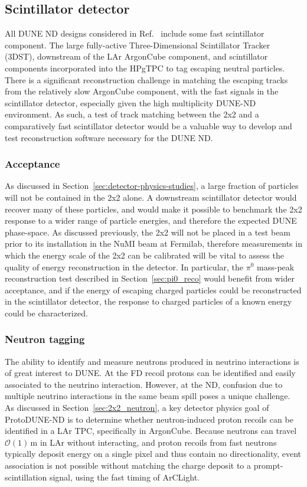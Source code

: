 \subsection{Scintillator detector}
\label{sec:minerva}
All DUNE ND designs considered in Ref.~\cite{dune_ndcsg} include some fast scintillator component. The large fully-active Three-Dimensional Scintillator Tracker (3DST), downstream of the LAr ArgonCube component, and scintillator components incorporated into the HPgTPC to tag escaping neutral particles. 
There is a significant reconstruction challenge in matching the escaping tracks from the relatively slow ArgonCube component, with the fast signals in the scintillator detector, especially given the high multiplicity DUNE-ND environment. 
As such, a test of track matching between the 2x2 and a comparatively fast scintillator detector would be a valuable way to develop and test reconstruction software necessary for the DUNE ND.


\subsubsection{Acceptance}
As discussed in Section~\ref{sec:detector-physics-studies}, a large fraction of particles will not be contained in the 2x2 alone. A downstream scintillator detector would recover many of these particles, and would make it possible to benchmark the 2x2 response to a wider range of particle energies, and therefore the expected DUNE phase-space. As discussed previously, the 2x2 will not be placed in a test beam prior to its installation in the NuMI beam at Fermilab, therefore measurements in which the energy scale of the 2x2 can be calibrated will be vital to assess the quality of energy reconstruction in the detector. In particular, the $\pi^{0}$ mass-peak reconstruction test described in Section~\ref{sec:pi0_reco} would benefit from wider acceptance, and if the energy of escaping charged particles could be reconstructed in the scintillator detector, the response to charged particles of a known energy could be characterized.

\subsubsection{Neutron tagging}
The ability to identify and measure neutrons produced in neutrino interactions is of great interest to DUNE.  At the FD recoil protons can be identified and easily associated to the neutrino interaction.  However, at the ND, confusion due to multiple neutrino interactions in the same beam spill poses a unique challenge.  As discussed in Section~\ref{sec:2x2_neutron}, a key detector physics goal of ProtoDUNE-ND is to determine whether neutron-induced proton recoils can be identified in a LAr TPC, specifically in ArgonCube. Because neutrons can travel $\mathcal{O}\left(1\right)\,\mathrm{m}$ in LAr without interacting, and proton recoils from fast neutrons typically deposit energy on a single pixel and thus contain no directionality, event association is not possible without matching the charge deposit to a prompt-scintillation signal, using the fast timing of ArCLight.
 
